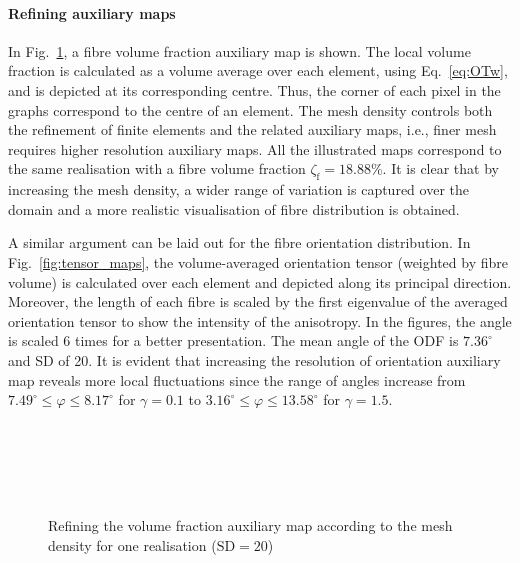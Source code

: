 	\paragraph{Refining auxiliary maps} In Fig.~\ref{fig:volfrac_maps}, a fibre volume fraction auxiliary map is shown. The local volume fraction is calculated as a volume average over each element, using Eq.~\eqref{eq:OTw}, and is depicted at its corresponding centre.  Thus, the corner of each pixel in the graphs correspond to the centre of an element. The mesh density controls both the refinement of finite elements and the related auxiliary maps, i.e., finer mesh requires higher resolution auxiliary maps. All the illustrated maps correspond to the same realisation with a fibre volume fraction $\zeta_\text{f}=18.88\%$. It is clear that by increasing the mesh density, a wider range of variation is captured over the domain and a more realistic visualisation of fibre distribution is obtained. 	
	
	A similar argument can be laid out for the fibre orientation distribution. In Fig.~\ref{fig:tensor_maps}, the volume-averaged orientation tensor (weighted by fibre volume) is calculated over each element and depicted along its principal direction. Moreover, the length of each fibre is scaled by the first eigenvalue of the averaged orientation tensor to show the intensity of the anisotropy. In the figures, the angle is scaled 6 times for a better presentation. The mean angle of the ODF is $7.36^\circ$ and SD of 20. It is evident that increasing the resolution of orientation auxiliary map reveals more local fluctuations since the range of angles increase from $7.49^\circ\le \varphi\le 8.17^\circ$ for $\gamma=0.1$ to $3.16^\circ\le \varphi \le13.58^\circ$ for $\gamma=1.5$.


\begin{figure}[!h]{}
  	\centering
	\\
	\\
	\\
	\\
	\caption{Refining the volume fraction auxiliary map according to the mesh density for one realisation ($\text{SD}=20$)}
	\label{fig:volfrac_maps}
\end{figure}%
\afterpage{\clearpage}

